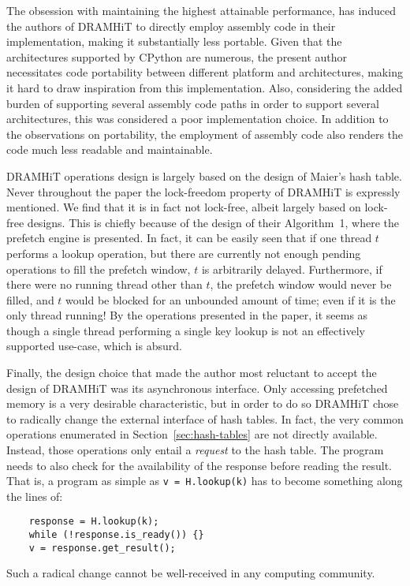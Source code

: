 The obsession with maintaining the highest attainable performance, has induced the authors of DRAMHiT to directly employ assembly code in their implementation, making it substantially less portable.
Given that the architectures supported by CPython are numerous, the present author necessitates code portability between different platform and architectures, making it hard to draw inspiration from this implementation.
Also, considering the added burden of supporting several assembly code paths in order to support several architectures, this was considered a poor implementation choice.
In addition to the observations on portability, the employment of assembly code also renders the code much less readable and maintainable.

DRAMHiT operations design is largely based on the design of Maier's hash table.
Never throughout the paper the lock-freedom property of DRAMHiT is expressly mentioned.
We find that it is in fact not lock-free, albeit largely based on lock-free designs.
This is chiefly because of the design of their Algorithm~1, where the prefetch engine is presented.
In fact, it can be easily seen that if one thread $t$ performs a lookup operation, but there are currently not enough pending operations to fill the prefetch window, $t$ is arbitrarily delayed.
Furthermore, if there were no running thread other than $t$, the prefetch window would never be filled, and $t$ would be blocked for an unbounded amount of time; even if it is the only thread running!
By the operations presented in the paper, it seems as though a single thread performing a single key lookup is not an effectively supported use-case, which is absurd.

Finally, the design choice that made the author most reluctant to accept the design of DRAMHiT was its asynchronous interface.
Only accessing prefetched memory is a very desirable characteristic, but in order to do so DRAMHiT chose to radically change the external interface of hash tables.
In fact, the very common operations enumerated in Section~\ref{sec:hash-tables} are not directly available.
Instead, those operations only entail a \emph{request} to the hash table.
The program needs to also check for the availability of the response before reading the result.
That is, a program as simple as \texttt{{v = H.lookup(k)}} has to become something along the lines of:
\begin{verbatim}
	response = H.lookup(k);
	while (!response.is_ready()) {}
	v = response.get_result();
\end{verbatim}
Such a radical change cannot be well-received in any computing community.

